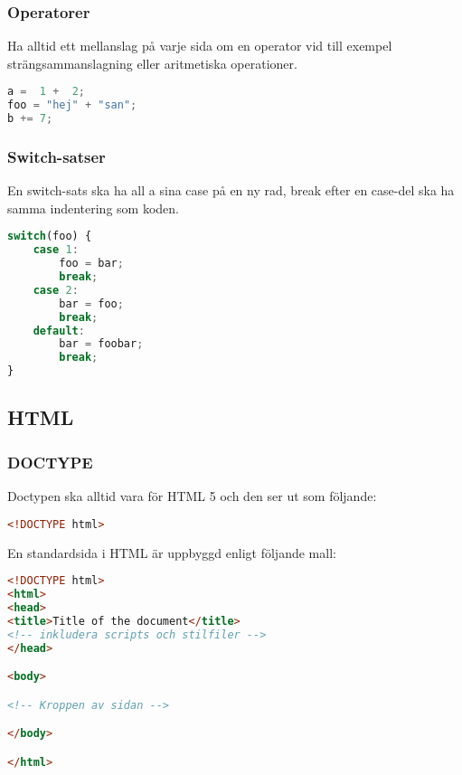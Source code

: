 \documentclass[a4paper, 12pt, titlepage]{article}
\begin{document}
            \subsubsection{Operatorer}
            Ha alltid ett mellanslag på varje sida om en operator vid till exempel strängsammanslagning eller aritmetiska operationer.
            
\begin{lstlisting}[language=JavaScript]
a =  1 +  2;
foo = "hej" + "san";
b += 7;
\end{lstlisting}
            
            \subsubsection{Switch-satser}
            En switch-sats ska ha all a sina case på en ny rad, break efter en case-del ska ha samma indentering som koden.
            
            
\begin{lstlisting}[language=JavaScript]
switch(foo) {
    case 1:
        foo = bar;
        break;
    case 2:
        bar = foo;
        break;
    default:
        bar = foobar;
        break;  
}
\end{lstlisting}
        
        \subsection{HTML}
            \subsubsection{DOCTYPE}
            Doctypen ska alltid vara för HTML 5 och den ser ut som följande:
\begin{lstlisting}[language=HTML]
<!DOCTYPE html>
\end{lstlisting}
            En standardsida i HTML är uppbyggd enligt följande mall:
\begin{lstlisting}[language=HTML]
<!DOCTYPE html>
<html>
<head>
<title>Title of the document</title>
<!-- inkludera scripts och stilfiler -->
</head>

<body>

<!-- Kroppen av sidan -->

</body>

</html>
\end{lstlisting}            
    
    
\end{document}
